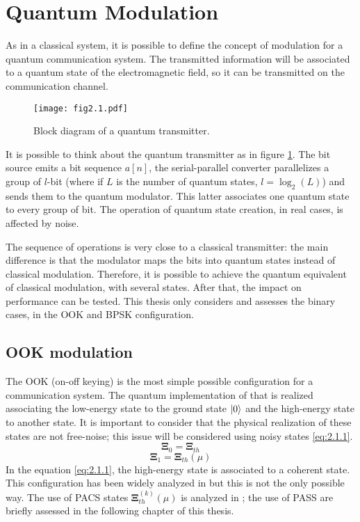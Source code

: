 \section{Quantum Modulation}
    As in a classical system, it is possible to define the concept of modulation for a 
    quantum communication system. The transmitted information will be associated to a 
    quantum state of the electromagnetic field, so it can be transmitted on the communication 
    channel.

    \begin{figure}[tbp]
        \texttt{[image: fig2.1.pdf]}
        \caption{Block diagram of a quantum transmitter.}
        \label{fig:2.1}
    \end{figure}
    It is possible to think about the quantum transmitter as in figure \ref{fig:2.1}. The bit source
    emits a bit sequence $a[n]$, the serial-parallel converter parallelizes a group of $l$-bit (where
    if $L$ is the number of quantum states, $l=\log_2(L)$) and sends them to the quantum modulator.
    This latter associates one quantum state to every group of bit. The operation of quantum state 
    creation, in real cases, is affected by noise.

    The sequence of operations is very close to a classical transmitter: the main difference is that
    the modulator maps the bits into quantum states instead of classical modulation. Therefore, it is 
    possible to achieve the quantum equivalent of classical modulation, with several states. After 
    that, the impact on performance can be tested.
    This thesis only considers and assesses the binary cases, in the OOK and BPSK 
    configuration.
    
    \subsection{OOK modulation}
        The OOK (on-off keying) is the most simple possible configuration for a communication system.
        The quantum implementation of that is realized associating the low-energy state to the 
        ground state $\ket{0}$ and the high-energy state to another state. It is important to
        consider that the physical realization of these states are not free-noise; this issue will be
        considered using noisy states \ref{eq:2.1.1}.
        \begin{equation}
            \pmb{\Xi}_0 = \pmb{\Xi}_{th}
            \label{eq:2.1.1}
        \end{equation}
        \begin{equation*}
            \pmb{\Xi}_1 = \pmb{\Xi}_{th}(\mu)
        \end{equation*}
        In the equation \ref{eq:2.1.1}, the high-energy state is associated to a coherent state. This 
        configuration has been widely analyzed in \cite{helstrom1,helstrom2,coherentComm1,coherentComm2,
        coherentComm3,coherentComm4} but this is not the only possible way. The use of PACS states 
        $\pmb{\Xi}_{th}^{(k)}(\mu)$ is analyzed in \cite{PACSDisc,tesiGuerrini}; the use of PASS are briefly
        assessed in the following chapter of this thesis.

